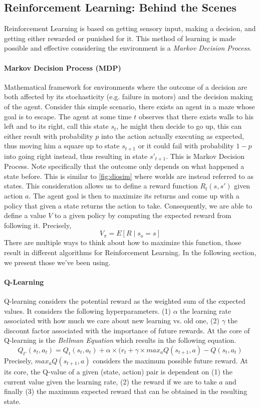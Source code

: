 \subsection{Reinforcement Learning: Behind the Scenes}
\label{sec:rldetails}
Reinforcement Learning is based on getting sensory input, making a decision, and getting either rewarded or punished for it. 
This method of learning is made possible and effective considering the environment is a \emph{Markov Decision Process}. 
\paragraph{Markov Decision Process (MDP)} Mathematical framework for environments where the outcome of a decision are both affected 
by its stochasticity (e.g. failure in motors) and the decision making of the agent. 
Consider this simple scenario, there exists an agent in a maze whose goal is to escape. The agent at some time $t$ observes that there exists 
walls to his left and to its right, call this state $s_t$, he might then decide to go up, this can either result with probability $p$ into the action actually executing as expected, 
thus moving him a square up to state $s_{t+1}$ or it could fail with probability $1-p$ into going right instead, thus resulting in state  $s'_{t+1}$. 
This is Markov Decision Process. Note specifically that the outcome only depends on what happened a state before. This is similar to \ref{fig:diosim} where worlds 
are instead referred to as states. 
This consideration allows us to define a reward function $R_t(s, s')$ given action $a$. The agent goal is then to maximize its returns 
and come up with a policy that given a state returns the action to take. 
Consequently, we are able to define a value $V$ to a given policy by computing the expected reward from following it. Precisely, 
\begin{equation*}
  V_\pi = E[R \mid s_o=s]
\end{equation*}
There are multiple ways to think about how to maximize this function, those result in different algorithms for Reinforcement Learning. In the following section, 
we present those we've been using. 
\paragraph{Q-Learning}
Q-learning considers the potential reward as the weighted sum of the expected values. It considers the following hyperparameters. 
(1) $\alpha$ the learning rate associated with how much we care about new learning vs. old one, (2) $\gamma$ the discount factor associated with 
the importance of future rewards. At the core of Q-learning is the \emph{Bellman Equation} which results in the following equation. 
\begin{equation*}
  Q_{t'}(s_t, a_t) = Q_{t}(s_t, a_t) + \alpha \times (r_t + \gamma \times max_a Q(s_{t+1}, a) - Q(s_t, a_t) 
\end{equation*}
Precisely, $max_a Q(s_{t+1}, a)$ considers the maximum possible future reward. At its core, the Q-value of a given (state, action) pair 
is dependent on (1) the current value given the learning rate, (2) the reward if we are to take $a$ and finally (3) the maximum 
expected reward that can be obtained in the resulting state. 

